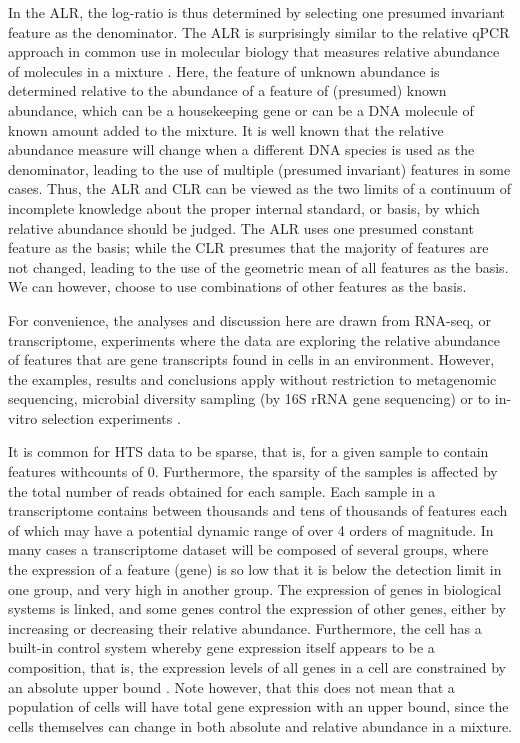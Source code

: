 \documentclass[10pt]{article}
\begin{document}
In the ALR, the log-ratio is thus determined by selecting one presumed invariant feature as the denominator. The ALR is surprisingly similar to the relative qPCR approach in common use in molecular biology that measures relative abundance of molecules in a mixture . Here, the feature of unknown abundance is determined relative to the abundance of a feature of (presumed) known abundance, which can be a housekeeping gene or can be a DNA molecule of known amount added to the mixture. It is well known that the relative abundance measure will change when a different DNA species is used as the denominator, leading to the use of multiple (presumed invariant) features in some cases. Thus, the ALR and CLR can be viewed as the two limits of a continuum of incomplete knowledge about the proper internal standard, or basis, by which relative abundance should be judged. The ALR uses one presumed constant feature as the basis; while the CLR  presumes that the majority of features are not changed, leading to the use of the geometric mean of all features as the basis. We can however, choose to use combinations of other features as the basis.

For convenience, the analyses and discussion here are drawn from RNA-seq, or transcriptome, experiments where the data are exploring the relative abundance of features that are gene transcripts found in cells in an environment. However, the examples, results and conclusions apply without restriction to metagenomic sequencing, microbial diversity sampling (by 16S rRNA gene sequencing) or to in-vitro selection experiments . 


It is common for HTS data to be sparse, that is, for a given sample to contain features withcounts of 0. Furthermore, the sparsity of the samples is affected by the total number of reads obtained for each sample. Each sample in a transcriptome contains between thousands and tens of thousands of features each of which may have a potential dynamic range of over 4 orders of magnitude. In many cases a transcriptome dataset will be composed of several groups, where the expression of a feature (gene) is so low that it is below the detection limit in one group, and very high in another group. The expression of genes in biological systems is linked, and some genes control the expression of other genes, either by increasing or decreasing their relative abundance. Furthermore, the cell has a built-in control system whereby gene expression itself appears to be a composition, that is, the expression levels of all genes in a cell are constrained by an absolute upper bound  . Note however, that this does not mean that a population of cells will have total gene expression with an upper bound, since the cells themselves can change in both absolute and relative abundance in a mixture. 
\end{document}
